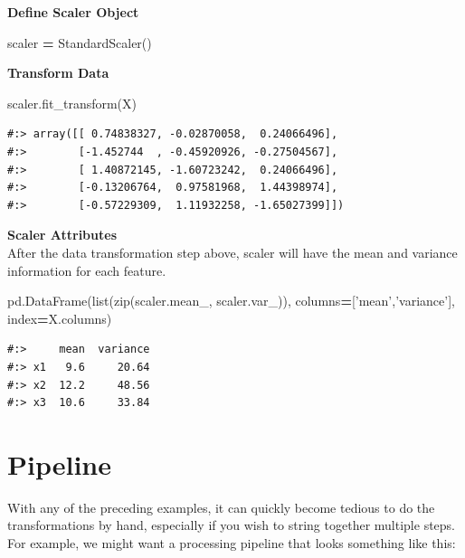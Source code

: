 \documentclass[
]{book}
\newenvironment{Shaded}{\begin{snugshade}}{\end{snugshade}}
\newcommand{\BuiltInTok}[1]{#1}
\newcommand{\NormalTok}[1]{#1}
\newcommand{\OperatorTok}[1]{\textcolor[rgb]{0.43,0.43,0.43}{\textbf{#1}}}
\newcommand{\StringTok}[1]{\textcolor[rgb]{0.5,0.5,0.5}{#1}}
\begin{document}
\textbf{Define Scaler Object}

\begin{Shaded}
\begin{Highlighting}[]
\NormalTok{scaler }\OperatorTok{=}\NormalTok{ StandardScaler()}
\end{Highlighting}
\end{Shaded}

\textbf{Transform Data}

\begin{Shaded}
\begin{Highlighting}[]
\NormalTok{scaler.fit_transform(X)}
\end{Highlighting}
\end{Shaded}

\begin{verbatim}
#:> array([[ 0.74838327, -0.02870058,  0.24066496],
#:>        [-1.452744  , -0.45920926, -0.27504567],
#:>        [ 1.40872145, -1.60723242,  0.24066496],
#:>        [-0.13206764,  0.97581968,  1.44398974],
#:>        [-0.57229309,  1.11932258, -1.65027399]])
\end{verbatim}

\textbf{Scaler Attributes}\\
After the data transformation step above, scaler will have the mean and variance information for each feature.

\begin{Shaded}
\begin{Highlighting}[]
\NormalTok{pd.DataFrame(}\BuiltInTok{list}\NormalTok{(}\BuiltInTok{zip}\NormalTok{(scaler.mean_, scaler.var_)), }
\NormalTok{             columns}\OperatorTok{=}\NormalTok{[}\StringTok{'mean'}\NormalTok{,}\StringTok{'variance'}\NormalTok{], }
\NormalTok{             index}\OperatorTok{=}\NormalTok{X.columns)}
\end{Highlighting}
\end{Shaded}

\begin{verbatim}
#:>     mean  variance
#:> x1   9.6     20.64
#:> x2  12.2     48.56
#:> x3  10.6     33.84
\end{verbatim}

\hypertarget{pipeline}{%
\section{Pipeline}\label{pipeline}}

With any of the preceding examples, it can quickly become tedious to do the transformations by hand, especially if you wish to string together multiple steps. For example, we might want a processing pipeline that looks something like this:
\end{document}

